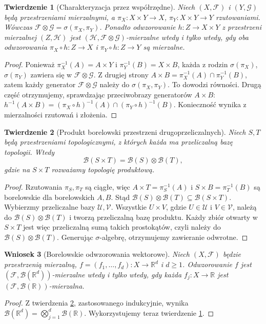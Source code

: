 \documentclass[11pt,a4paper,oneside]{book}
\numberwithin{equation}{chapter}
\theoremstyle{plain}
\newtheorem{twierdzenie}{Twierdzenie}[chapter]
\newtheorem{wniosek}[twierdzenie]{Wniosek}
\theoremstyle{definition}
\theoremstyle{remark}
\begin{document}
\begin{twierdzenie}[Charakteryzacja przez współrzędne]
\label{thm:product-projections}
Niech $(X,\mathcal F)$ i $(Y,\mathcal G)$ będą
przestrzeniami mierzalnymi, a
$\pi_X:X\times Y\to X$, $\pi_Y:X\times Y\to Y$
rzutowaniami. Wówczas
$\mathcal F\otimes\mathcal G=\sigma(\pi_X,\pi_Y)$.
Ponadto odwzorowanie $h:Z\to X\times Y$ z przestrzeni
mierzalnej $(Z,\mathcal H)$ jest
$(\mathcal H,\mathcal F\otimes\mathcal G)$-mierzalne
wtedy i tylko wtedy, gdy oba odwzorowania
$\pi_X\circ h:Z\to X$ i $\pi_Y\circ h:Z\to Y$ są mierzalne.
\end{twierdzenie}
\begin{proof}
Ponieważ $\pi_X^{-1}(A)=A\times Y$ i
$\pi_Y^{-1}(B)=X\times B$, każda z rodzin
$\sigma(\pi_X)$, $\sigma(\pi_Y)$ zawiera się w
$\mathcal F\otimes\mathcal G$. Z drugiej strony
$A\times B=\pi_X^{-1}(A)\cap\pi_Y^{-1}(B)$,
zatem każdy generator $\mathcal F\otimes\mathcal G$
należy do $\sigma(\pi_X,\pi_Y)$. To dowodzi równości.
Drugą część otrzymujemy, sprawdzając przeciwobrazy
generatorów $A\times B$:
$h^{-1}(A\times B)=(\pi_X\circ h)^{-1}(A)
\cap(\pi_Y\circ h)^{-1}(B)$.
Konieczność wynika z mierzalności rzutowań i złożenia.
\end{proof}

\begin{twierdzenie}[Produkt borelowski przestrzeni drugoprzeliczalnych]
\label{thm:borel-product}
Niech $S,T$ będą przestrzeniami topologicznymi, z których
każda ma przeliczalną bazę topologii. Wtedy
\[
\mathcal B(S\times T)=\mathcal B(S)\otimes\mathcal B(T),
\]
gdzie na $S\times T$ rozważamy topologię produktową.
\end{twierdzenie}
\begin{proof}
Rzutowania $\pi_S,\pi_T$ są ciągłe, więc
$A\times T=\pi_S^{-1}(A)$ i $S\times B=\pi_T^{-1}(B)$
są borelowskie dla borelowskich $A,B$.
Stąd $\mathcal B(S)\otimes\mathcal B(T)\subseteq
\mathcal B(S\times T)$.
Wybierzmy przeliczalne bazy $\mathcal U,\mathcal V$.
Wszystkie $U\times V$, gdzie $U\in\mathcal U$ i
$V\in\mathcal V$, należą do
$\mathcal B(S)\otimes\mathcal B(T)$ i tworzą
przeliczalną bazę produktu. Każdy zbiór otwarty
w $S\times T$ jest więc przeliczalną sumą takich
prostokątów, czyli należy do $\mathcal B(S)\otimes\mathcal B(T)$.
Generując $\sigma$-algebrę, otrzymujemy zawieranie odwrotne.
\end{proof}

\begin{wniosek}[Borelowskie odwzorowania wektorowe]
\label{cor:coordinate-measurable}
Niech $(X,\mathcal F)$ będzie przestrzenią mierzalną,
$f=(f_1,\ldots,f_d):X\to\mathbb R^d$ i $d\ge1$.
Odwzorowanie $f$ jest $(\mathcal F,\mathcal B(\mathbb R^d))$-mierzalne
wtedy i tylko wtedy, gdy każda $f_j:X\to\mathbb R$
jest $(\mathcal F,\mathcal B(\mathbb R))$-mierzalna.
\end{wniosek}
\begin{proof}
Z twierdzenia \ref{thm:borel-product}, zastosowanego
indukcyjnie, wynika
$\mathcal B(\mathbb R^d)=\bigotimes_{j=1}^d\mathcal B(\mathbb R)$.
Wykorzystujemy teraz twierdzenie \ref{thm:product-projections}.
\end{proof}
\end{document}
